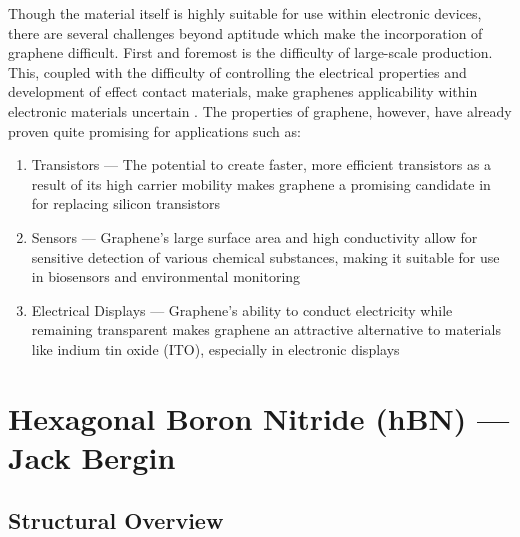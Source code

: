 \documentclass[conference]{IEEEtran}
\begin{document}
Though the material itself is highly suitable for use within electronic devices, there are several challenges beyond aptitude which make the incorporation of graphene difficult. First and foremost is the difficulty of large-scale production. This, coupled with the difficulty of controlling the electrical properties and development of effect contact materials, make graphenes applicability within electronic materials uncertain \cite{mb9}. The properties of graphene, however, have already proven quite promising for applications such as:

\begin{enumerate}

  \item Transistors — The potential to create faster, more efficient transistors as a result of its high carrier mobility makes graphene a promising candidate in for replacing silicon transistors

  \item Sensors — Graphene's large surface area and high conductivity allow for sensitive detection of various chemical substances, making it suitable for use in biosensors and environmental monitoring

  \item Electrical Displays — Graphene's ability to conduct electricity while remaining transparent makes graphene an attractive alternative to materials like indium tin oxide (ITO), especially in electronic displays

\end{enumerate}

\section{Hexagonal Boron Nitride (hBN) — Jack Bergin}

\subsection{Structural Overview}
\end{document}
